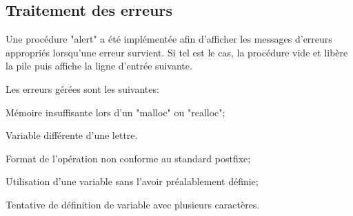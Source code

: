 \documentclass[]{report}
\begin{document}
	\begin{normalsize}
		\section*{\LARGE Traitement des erreurs}\vspace{4mm}
		Une procédure "alert" a été implémentée afin d'afficher les messages d'erreurs appropriés lorsqu'une erreur survient. Si tel est le cas, la procédure vide et libère la pile puis affiche la ligne d'entrée suivante.\vspace{4mm}
		\par Les erreurs gérées sont les suivantes:
			\begin{description}[noitemsep]
			\item \hspace{4mm}Mémoire insuffisante lors d'un "malloc" ou "realloc";
			\item \hspace{4mm}Variable différente d'une lettre.
			\item \hspace{4mm}Format de l'opération non conforme au standard postfixe;
			\item \hspace{4mm}Utilisation d'une variable sans l'avoir préalablement définie;
			\item \hspace{4mm}Tentative de définition de variable avec plusieurs caractères.
		\end{description}
		\vspace{4mm}
	\end{normalsize}
\end{document}
